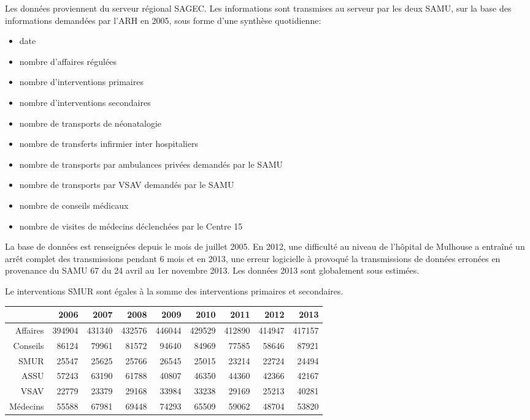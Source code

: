 \documentclass[12pt,english,french,twoside]{book}\usepackage[]{graphicx}\usepackage[]{color}
\begin{document}
Les données proviennent du serveur régional SAGEC. Les informations sont transmises au serveur par les deux SAMU, sur la base des informations demandées par l'ARH en 2005, sous forme d'une synthèse quotidienne:
\begin{itemize}
  \item date
  \item nombre d'affaires régulées
  \item nombre d'interventions primaires
  \item nombre d'interventions secondaires
  \item nombre de transports de néonatalogie
  \item nombre de transferts infirmier inter hospitaliers
  \item nombre de transports par ambulances privées demandés par le SAMU
  \item nombre de transports par VSAV demandés par le SAMU
  \item nombre de conseils médicaux
  \item nombre de visites de médecins déclenchées par le Centre 15
\end{itemize}
La base de données est renseignées depuis le mois de juillet 2005. En 2012, une difficulté au niveau de l'hôpital de Mulhouse a entraîné un arrêt complet des transmissions pendant 6 mois et en 2013, une erreur logicielle à provoqué la transmissions de données erronées en provenance du SAMU 67 du 24 avril au 1er novembre 2013. Les données 2013 sont globalement sous estimées.

Le interventions SMUR sont égales à la somme des interventions primaires et secondaires.


\begin{table}[ht]
\centering
\begin{tabular}{rrrrrrrrr}
  \hline
 & 2006 & 2007 & 2008 & 2009 & 2010 & 2011 & 2012 & 2013 \\ 
  \hline
Affaires & 394904 & 431340 & 432576 & 446044 & 429529 & 412890 & 414947 & 417157 \\ 
  Conseils & 86124 & 79961 & 81572 & 94640 & 84969 & 77585 & 58646 & 87921 \\ 
  SMUR & 25547 & 25625 & 25766 & 26545 & 25015 & 23214 & 22724 & 24494 \\ 
  ASSU & 57243 & 63190 & 61788 & 40807 & 46350 & 44360 & 42366 & 42167 \\ 
  VSAV & 22779 & 23379 & 29168 & 33984 & 33238 & 29169 & 25213 & 40281 \\ 
  Médecins & 55588 & 67981 & 69448 & 74293 & 65509 & 59062 & 48704 & 53820 \\ 
   \hline
\end{tabular}
\end{table}
\end{document}

